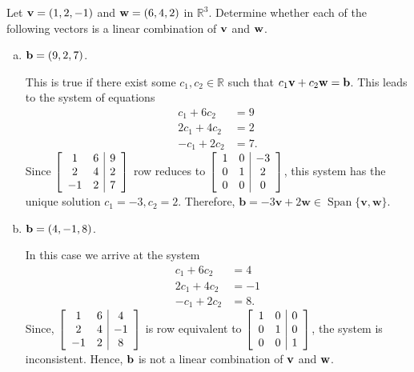 \documentclass[12pt,letterpaper,reqno]{article}
\numberwithin{equation}{section}
\DeclareMathOperator{\Span}{Span}
\begin{document}
\begin{example}\label{ex:first_span_ex}
Let ${\bf v}=(1,2,-1)$ and ${\bf w}=(6,4,2)$ in $\mathbb{R}^3$. Determine whether each of the following vectors is a linear combination of ${\bf v}$ and ${\bf w}$.
\begin{enumerate}[(a)]
	\item ${\bf b}=(9,2,7)$. 
	{\color{red} 
\begin{solution}
This is true if there exist some $c_1,c_2 \in \mathbb{R}$ such that $c_1{\bf v}+c_2{\bf w}={\bf b}$. This leads to the system of equations \begin{align*}
		c_1+6c_2&=9 \\
		2c_1+4c_2&=2 \\
		-c_1+2c_2&=7.
	\end{align*} 
Since $\left[\begin{array}{c c | c}
		1 & 6  & 9 \\
	2 & 4 & 2 \\
	-1 & 2 & 7
	\end{array}\right]$ row reduces to $\left[\begin{array}{c c | c}
		1 & 0  & -3 \\
	0 & 1 & 2 \\
	0 & 0 & 0
	\end{array}\right]$,	
this system has the unique solution $c_1=-3, c_2=2$. Therefore, $\mathbf{b}=-3\mathbf{v}+2\mathbf{w} \in \Span \{\mathbf{v},\mathbf{w}\}$.	
\end{solution}}
	\item ${\bf b}=(4,-1,8)$. 
	{\color{red} 
\begin{solution}
In this case we arrive at the system \begin{align*}
		c_1+6c_2&=4 \\ 2c_1+4c_2 &= -1 \\
		-c_1 + 2c_2 &=8.
	\end{align*} 
Since, 	$\left[\begin{array}{c c | c}
		1 & 6  & 4 \\
	2 & 4 & -1 \\
	-1 & 2 & 8
	\end{array}\right]$ is row equivalent to $\left[\begin{array}{c c | c}
		1 & 0  & 0 \\
	0 & 1 & 0 \\
	0 & 0 & 1
	\end{array}\right]$,
	the system is inconsistent. Hence, ${\bf b}$ is not a linear combination of ${\bf v}$ and ${\bf w}$.	
\end{solution}}
\end{enumerate}	
\end{example}
\end{document}
